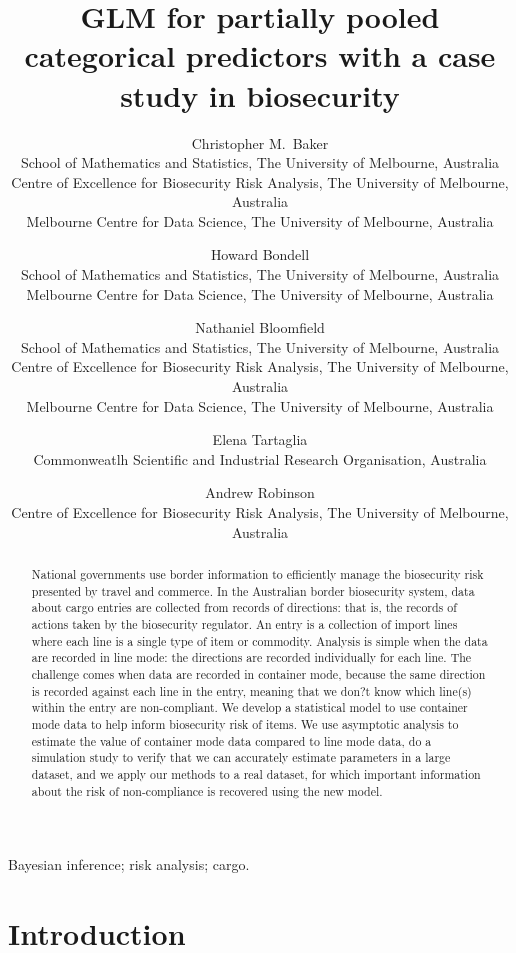 \documentclass[useAMS,usenatbib,referee]{biom}
\title[GLM for partially pooled data]{GLM for partially pooled categorical predictors with a case study in biosecurity}
\author
{Christopher M.\ Baker\emailx{cbaker1@unimelb.edu.au} \\
School of Mathematics and Statistics, The University of Melbourne, Australia\\
Centre of Excellence for Biosecurity Risk Analysis,  The University of Melbourne, Australia\\
Melbourne Centre for Data Science,  The University of Melbourne, Australia
\and
Howard Bondell \emailx{ howard.bondell@unimelb.edu.au} \\
School of Mathematics and Statistics, The University of Melbourne, Australia\\
Melbourne Centre for Data Science,  The University of Melbourne, Australia
\and
Nathaniel Bloomfield \emailx{nathaniel.bloomfield@unimelb.edu.au } \\
School of Mathematics and Statistics, The University of Melbourne, Australia\\
Centre of Excellence for Biosecurity Risk Analysis,  The University of Melbourne, Australia\\
Melbourne Centre for Data Science,  The University of Melbourne, Australia
\and
Elena Tartaglia \emailx{elena.tartaglia@data61.csiro.au } \\
Commonweatlh Scientific and Industrial Research Organisation, Australia
\and
Andrew Robinson \emailx{apro@unimelb.edu.au } \\
Centre of Excellence for Biosecurity Risk Analysis,  The University of Melbourne, Australia}
\begin{document}


\pagerange{\pageref{firstpage}--\pageref{lastpage}} 


\label{firstpage}


\begin{abstract}
National governments use border information to efficiently manage the biosecurity risk presented by travel and commerce. In the Australian border biosecurity system, data about cargo entries are collected from records of directions: that is, the records of actions taken by the biosecurity regulator. An entry is a collection of import lines where each line is a single type of item or commodity. Analysis is simple when the data are recorded in line mode: the directions are recorded individually for each line. The challenge comes when data are recorded in container mode, because the same direction is recorded against each line in the entry, meaning that we don?t know which line(s) within the entry are non-compliant. We develop a statistical model to use container mode data to help inform biosecurity risk of items. We use asymptotic analysis to estimate the value of container mode data compared to line mode data, do a simulation study to verify that we can accurately estimate parameters in a large dataset, and we apply our methods to a real dataset, for which important information about the risk of non-compliance is recovered using the new model.
\end{abstract}

\begin{keywords}
Bayesian inference;  risk analysis; cargo.
\end{keywords}

\maketitle

\section{Introduction}
\end{document}
